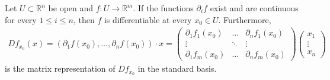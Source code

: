 \begin{theorem}\label{thm:suff-cond-diff}
	Let $U \subset \mathbb{R}^{n}$ be open and $f: U \to \mathbb{R}^{m}$. If the functions $\partial_{i}f$ exist and are continuous for every $1 \leq i \leq n$, then $f$ is differentiable at every $x_{0} \in U$. Furthermore,
	\begin{align*}
		Df_{x_{0}}(x) = (\partial_{1}f(x_{0}), \dots, \partial_{n}f(x_{0})) \cdot x =
		\begin{pmatrix}
			\partial_{1}f_{1}(x_{0}) & \dots  & \partial_{n}f_{1}(x_{0}) \\
			\vdots                   & \ddots & \vdots                   \\
			\partial_{1}f_{m}(x_{0}) & \dots  & \partial_{n}f_{m}(x_{0})
		\end{pmatrix}
		\begin{pmatrix}
			x_{1} \\ \vdots \\ x_{n}
		\end{pmatrix}
	\end{align*}
	is the matrix representation of $Df_{x_{0}}$ in the standard basis.
\end{theorem}

